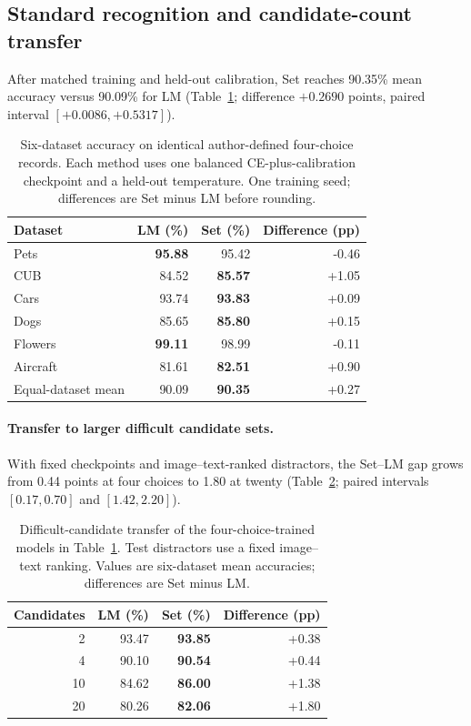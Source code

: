 \subsection{Standard recognition and candidate-count transfer}
\label{sec:unified-recognition}
After matched training and held-out calibration, Set reaches 90.35\% mean accuracy versus 90.09\% for LM (Table~\ref{tab:unified-standard}; difference $+0.2690$ points, paired interval $[+0.0086,+0.5317]$).
\begin{table}[htbp]
\centering\small
\begin{tabular}{lrrr}
\toprule
Dataset & LM (\%) & Set (\%) & Difference (pp) \\
\midrule
Pets & \textbf{95.88} & 95.42 & -0.46 \\
CUB & 84.52 & \textbf{85.57} & +1.05 \\
Cars & 93.74 & \textbf{93.83} & +0.09 \\
Dogs & 85.65 & \textbf{85.80} & +0.15 \\
Flowers & \textbf{99.11} & 98.99 & -0.11 \\
Aircraft & 81.61 & \textbf{82.51} & +0.90 \\
\midrule
Equal-dataset mean & 90.09 & \textbf{90.35} & +0.27 \\
\bottomrule
\end{tabular}
\caption{Six-dataset accuracy on identical author-defined four-choice records. Each method uses one balanced CE-plus-calibration checkpoint and a held-out temperature. One training seed; differences are Set minus LM before rounding.}
\label{tab:unified-standard}
\end{table}

\paragraph{Transfer to larger difficult candidate sets.}
With fixed checkpoints and image--text-ranked distractors, the Set--LM gap grows from 0.44 points at four choices to 1.80 at twenty (Table~\ref{tab:full-method-hard}; paired intervals $[0.17,0.70]$ and $[1.42,2.20]$).
\begin{table}[htbp]
\centering\small
\begin{tabular}{rrrr}
\toprule
Candidates & LM (\%) & Set (\%) & Difference (pp) \\
\midrule
2 & 93.47 & \textbf{93.85} & +0.38 \\
4 & 90.10 & \textbf{90.54} & +0.44 \\
10 & 84.62 & \textbf{86.00} & +1.38 \\
20 & 80.26 & \textbf{82.06} & +1.80 \\
\bottomrule
\end{tabular}
\caption{Difficult-candidate transfer of the four-choice-trained models in Table~\ref{tab:unified-standard}. Test distractors use a fixed image--text ranking. Values are six-dataset mean accuracies; differences are Set minus LM.}
\label{tab:full-method-hard}
\end{table}


